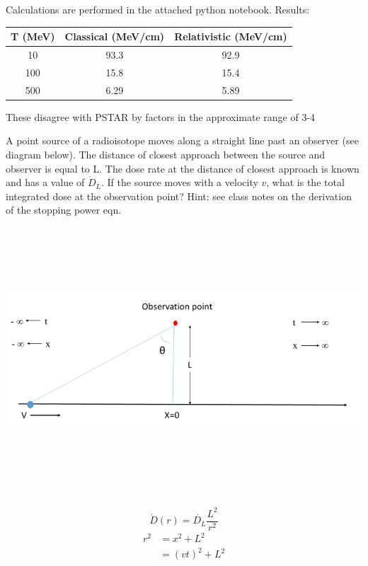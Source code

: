\documentclass{hw}
\begin{document}
	Calculations are performed in the attached python notebook. Results:
	\begin{table}[h]
		\begin{tabular}{ |c|c|c| }
			\hline
			T (MeV) & Classical (MeV/cm) & Relativistic (MeV/cm) \\
			\hline
			10 & 93.3 & 92.9 \\
			100 & 15.8 & 15.4 \\
			500 & 6.29 & 5.89 \\
			\hline
		\end{tabular}
	\end{table}

	These disagree with PSTAR by factors in the approximate range of 3-4


\problem{}
	A point source of a radioisotope moves along a straight line past an observer (see diagram below). The distance of closest approach between the source and observer is equal to L. The dose rate at the distance of closest approach is known and has a value of $ \dot{D}_L $. If the source moves with a velocity $ v $, what is the total integrated dose at the observation point? Hint: see class notes on the derivation of the stopping power eqn.

	\includegraphics[width=15cm,height=10cm,keepaspectratio]{ne551_03_fig_01}

\solution
\[
	\dot{D}(r) = \dot{D_L}\frac{L^2}{r^2}
\]
	\begin{align*}
		r^2 &= x^2 + L^2 \\
		&= \left( vt \right)^2 + L^2
	\end{align*}
\end{document}
